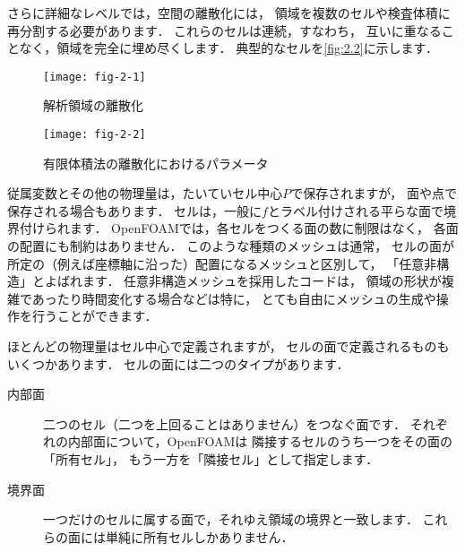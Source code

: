 さらに詳細なレベルでは，空間の離散化には，
領域を複数のセルや検査体積に再分割する必要があります．
これらのセルは連続，すなわち，
互いに重なることなく，領域を完全に埋め尽くします．
典型的なセルを\autoref{fig:2.2}に示します．


\begin{figure}[ht]
 \texttt{[image: fig-2-1]}
 \caption{解析領域の離散化}
 \label{fig:2.1}
\end{figure}


\begin{figure}[ht]
 \texttt{[image: fig-2-2]}
 \caption{有限体積法の離散化におけるパラメータ}
 \label{fig:2.2}
\end{figure}


従属変数とその他の物理量は，たいていセル中心$P$で保存されますが，
面や点で保存される場合もあります．
セルは，一般に$f$とラベル付けされる平らな面で境界付けられます．
OpenFOAMでは，各セルをつくる面の数に制限はなく，
各面の配置にも制約はありません．
このような種類のメッシュは通常，
セルの面が所定の（例えば座標軸に沿った）配置になるメッシュと区別して，
「任意非構造」とよばれます．
任意非構造メッシュを採用したコードは，
領域の形状が複雑であったり時間変化する場合などは特に，
とても自由にメッシュの生成や操作を行うことができます．

ほとんどの物理量はセル中心で定義されますが，
セルの面で定義されるものもいくつかあります．
セルの面には二つのタイプがあります．
\begin{description}
 \item[内部面] 二つのセル（二つを上回ることはありません）をつなぐ面です．
            それぞれの内部面について，OpenFOAMは
            隣接するセルのうち一つをその面の「所有セル」，
            もう一方を「隣接セル」として指定します．
 \item[境界面] 一つだけのセルに属する面で，それゆえ領域の境界と一致します．
            これらの面には単純に所有セルしかありません．
\end{description}


